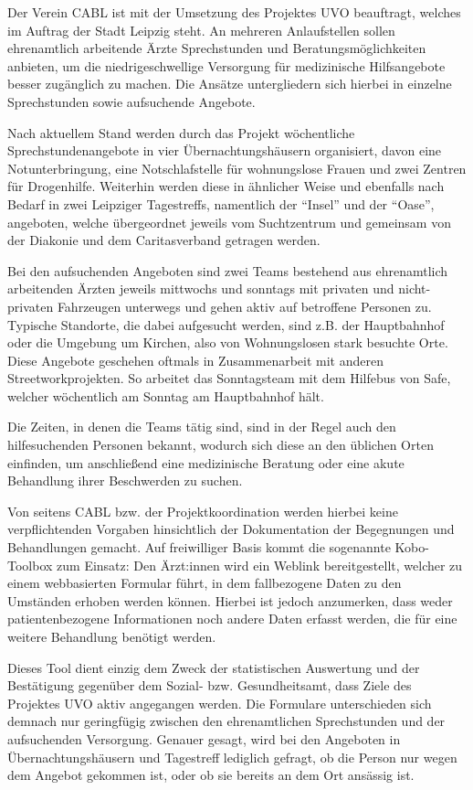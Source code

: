 Der Verein \ac{CABL} ist mit der Umsetzung des Projektes \ac{UVO} beauftragt, welches im Auftrag der Stadt Leipzig steht. An mehreren Anlaufstellen sollen ehrenamtlich arbeitende Ärzte Sprechstunden und Beratungsmöglichkeiten anbieten, um die niedrigeschwellige Versorgung für medizinische Hilfsangebote besser zugänglich zu machen. Die Ansätze untergliedern sich hierbei in einzelne Sprechstunden sowie aufsuchende Angebote.

Nach aktuellem Stand werden durch das Projekt wöchentliche Sprechstundenangebote in vier Übernachtungshäusern organisiert, davon eine Notunterbringung, eine Notschlafstelle für wohnungslose Frauen und zwei Zentren für Drogenhilfe. Weiterhin werden diese in ähnlicher Weise und ebenfalls nach Bedarf in zwei Leipziger Tagestreffs, namentlich der \enquote{Insel} und der \enquote{Oase}, angeboten, welche übergeordnet jeweils vom Suchtzentrum und gemeinsam von der Diakonie und dem Caritasverband getragen werden.

Bei den aufsuchenden Angeboten sind zwei Teams bestehend aus ehrenamtlich arbeitenden Ärzten jeweils mittwochs und sonntags mit privaten und nicht-privaten Fahrzeugen unterwegs und gehen aktiv auf betroffene Personen zu. Typische Standorte, die dabei aufgesucht werden, sind z.B. der Hauptbahnhof oder die Umgebung um Kirchen, also von Wohnungslosen stark besuchte Orte. Diese Angebote geschehen oftmals in Zusammenarbeit mit anderen Streetworkprojekten. So arbeitet das Sonntagsteam mit dem Hilfebus von \ac{Safe}, welcher wöchentlich am Sonntag am Hauptbahnhof hält.

Die Zeiten, in denen die Teams tätig sind, sind in der Regel auch den hilfesuchenden Personen bekannt, wodurch sich diese an den üblichen Orten einfinden, um anschließend eine medizinische Beratung oder eine akute Behandlung ihrer Beschwerden zu suchen.

Von seitens CABL bzw. der Projektkoordination werden hierbei keine verpflichtenden Vorgaben hinsichtlich der Dokumentation der Begegnungen und Behandlungen gemacht. Auf freiwilliger Basis kommt die sogenannte Kobo-Toolbox zum Einsatz: Den Ärzt:innen wird ein Weblink bereitgestellt, welcher zu einem webbasierten Formular führt, in dem fallbezogene Daten zu den Umständen erhoben werden können. Hierbei ist jedoch anzumerken, dass weder patientenbezogene Informationen noch andere Daten erfasst werden, die für eine weitere Behandlung benötigt werden.

Dieses Tool dient einzig dem Zweck der statistischen Auswertung und der Bestätigung gegenüber dem Sozial- bzw. Gesundheitsamt, dass Ziele des Projektes UVO aktiv angegangen werden. Die Formulare unterschieden sich demnach nur geringfügig zwischen den ehrenamtlichen Sprechstunden und der aufsuchenden Versorgung. Genauer gesagt, wird bei den Angeboten in Übernachtungshäusern und Tagestreff lediglich gefragt, ob die Person nur wegen dem Angebot gekommen ist, oder ob sie bereits an dem Ort ansässig ist.

